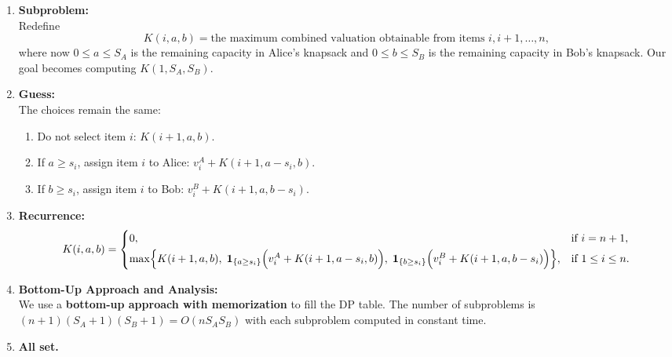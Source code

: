 \documentclass[11pt]{article}
\begin{document}
    \begin{enumerate}
        \item \textbf{Subproblem:}\\
        Redefine 
        \[
        K(i,a,b)= \text{the maximum combined valuation obtainable from items } i,i+1,\dots,n,
        \]
        where now \(0\le a\le S_A\) is the remaining capacity in Alice's knapsack and \(0\le b\le S_B\) is the remaining capacity in Bob's knapsack. Our goal becomes computing \(K(1,S_A,S_B)\).
    
        \item \textbf{Guess:}\\
        The choices remain the same:
        \begin{enumerate}
            \item Do not select item \(i\): \(K(i+1,a,b)\).
            \item If \(a\ge s_i\), assign item \(i\) to Alice: \(v_i^A+K(i+1,a-s_i,b)\).
            \item If \(b\ge s_i\), assign item \(i\) to Bob: \(v_i^B+K(i+1,a,b-s_i)\).
        \end{enumerate}
    
        \item \textbf{Recurrence:}\\[1mm]
        \[
        K(i,a,b)=
        \begin{cases}
        0, & \text{if } i=n+1,\\[1mm]
        \max \Bigl\{ K(i+1,a,b), \; 
        \mathbf{1}_{\{a\ge s_i\}}\Bigl(v_i^A+K(i+1,a-s_i,b)\Bigr), \; 
        \mathbf{1}_{\{b\ge s_i\}}\Bigl(v_i^B+K(i+1,a,b-s_i)\Bigr) \Bigr\}, & \text{if } 1\le i\le n.
        \end{cases}
        \]
    
        \item \textbf{Bottom-Up Approach and Analysis:}\\[1mm]
        We use a \textbf{bottom-up approach with memorization} to fill the DP table. The number of subproblems is \((n+1)(S_A+1)(S_B+1)=O(nS_A S_B)\) with each subproblem computed in constant time.
    
        \item \textbf{All set.}
    \end{enumerate}
    \newpage
\end{document}

